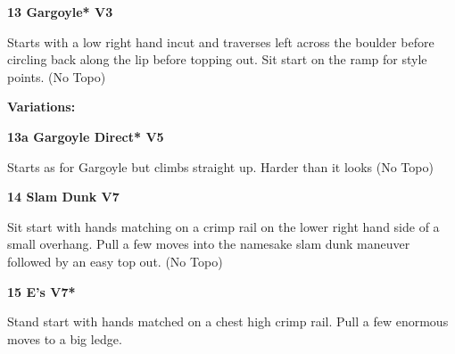 \begin{multicols}{2}
\begin{minipage}{\columnwidth}
			\end{minipage}
			
					\begin{minipage}{\linewidth}	
					\label{rt:Gargoyle}
\colorbox{green!20}{
\parbox{0.95\textwidth}{
\textbf{
13 Gargoyle* V3    
}
}
}

					\begin{adjustwidth}{0.5cm}{}				
					Starts with a low right hand incut and traverses left across the boulder before circling back along the lip before topping out. Sit start on the ramp for style points.
						\newline (No Topo) 
					\end{adjustwidth}
					\end{minipage}
						\begin{adjustwidth}{0.5cm}{}				
						\textbf{Variations:} \newline
							\begin{minipage}{\linewidth}	
							\label{vr:Gargoyle Direct}
\colorbox{RoyalBlue!20}{
\parbox{0.95\textwidth}{
\textbf{
13a Gargoyle Direct* V5    
}
}
}

							\begin{adjustwidth}{0.5cm}{}				
							Starts as for Gargoyle but climbs straight up. Harder than it looks
								\newline (No Topo) 
							\end{adjustwidth}
							\end{minipage}
						\end{adjustwidth}
					\begin{minipage}{\linewidth}	
					\label{rt:Slam Dunk}
\colorbox{Goldenrod!50}{
\parbox{0.95\textwidth}{
\textbf{
14 Slam Dunk V7  
}
}
}

					\begin{adjustwidth}{0.5cm}{}				
					Sit start with hands matching on a crimp rail on the lower right hand side of a small overhang. Pull a few moves into the namesake slam dunk maneuver followed by an easy top out.
						\newline (No Topo) 
					\end{adjustwidth}
					\end{minipage}
					\begin{minipage}{\linewidth}	
					\label{rt:E's}
\colorbox{Goldenrod!50}{
\parbox{0.95\textwidth}{
\textbf{
15 E's V7*  
}
}
}

					\begin{adjustwidth}{0.5cm}{}				
					Stand start with hands matched on a chest high crimp rail. Pull a few enormous moves to a big ledge.
					\end{adjustwidth}
					\end{minipage}


\end{multicols}
